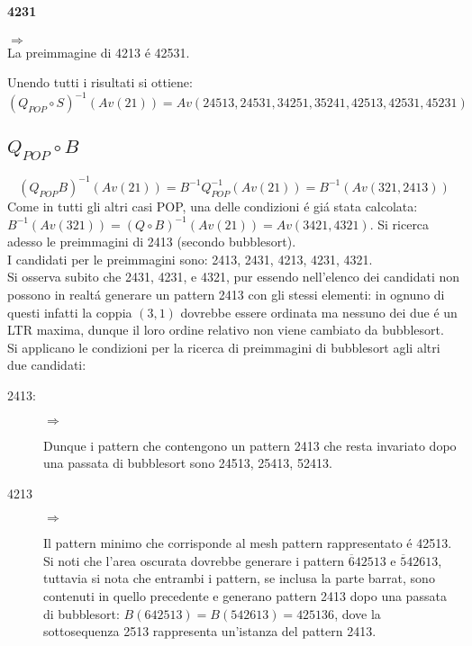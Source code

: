 \paragraph*{4231}\begin{center}$\Rightarrow$\\La preimmagine di 4213 \'e 42531.\end{center}
Unendo tutti i risultati si ottiene:$$(Q_{POP}\circ{S})^{-1}(Av(21)) = Av(24513, 24531, 34251, 35241, 42513, 42531, 45231)$$
\subsection*{$Q_{POP}\circ{B}$}
$$(Q_{POP}{B})^{-1}(Av(21)) = B^{-1}Q_{POP}^{-1}(Av(21))=B^{-1}(Av(321,2413))$$
Come in tutti gli altri casi POP, una delle condizioni \'e gi\'a stata calcolata: $B^{-1}(Av(321))=(Q\circ{B})^{-1}(Av(21))=Av(3421,4321)$. Si ricerca adesso le preimmagini di 2413 (secondo bubblesort).\\
I candidati per le preimmagini sono: 2413, 2431, 4213, 4231, 4321.\\
Si osserva subito che 2431, 4231, e 4321, pur essendo nell'elenco dei candidati non possono in realt\'a generare un pattern 2413 con gli stessi elementi: in ognuno di questi infatti la coppia $(3,1)$ dovrebbe essere ordinata ma nessuno dei due \'e un LTR maxima, dunque il loro ordine relativo non viene cambiato da bubblesort.\\
Si applicano le condizioni per la ricerca di preimmagini di bubblesort agli altri due candidati:
\begin{description}
	\item[2413:]\begin{center}$\Rightarrow$\end{center}
	Dunque i pattern che contengono un pattern 2413 che resta invariato dopo una passata di bubblesort sono 24513, 25413, 52413.
	\item[4213]\begin{center}$\Rightarrow$\end{center}
	Il pattern minimo che corrisponde al mesh pattern rappresentato \'e 42513.\\
	Si noti che l'area oscurata dovrebbe generare i pattern $\overline{6}42513$ e $\overline{5}42613$, tuttavia si nota che entrambi i pattern, se inclusa la parte barrat, sono contenuti in quello precedente e generano pattern 2413 dopo una passata di bubblesort: $B(642513) = B(542613) =425136$, dove la sottosequenza 2513 rappresenta un'istanza del pattern 2413.
\end{description}
